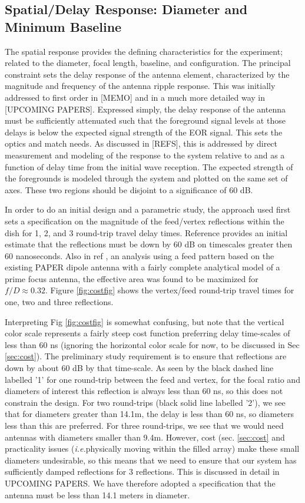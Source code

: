\documentclass{article}
\begin{document}
\subsection{Spatial/Delay Response:  Diameter and Minimum Baseline}
The spatial response provides the defining characteristics for the experiment; related to the diameter, focal length, baseline, and configuration.  The principal constraint sets the delay response of the antenna element, characterized by the magnitude and frequency of the antenna ripple response.  This was initially addressed to first order in [MEMO] and in a much more detailed way in [UPCOMING PAPERS].  Expressed simply, the delay response of the antenna must be sufficiently attenuated such that the foreground signal levels at those delays is below the expected signal strength of the EOR signal.  This sets the optics and match needs.  As discussed in [REFS], this is addressed by direct measurement and modeling of the response to the system relative to and as a function of delay time from the initial wave reception.  The expected strength of the foregrounds is modeled through the system and plotted on the same set of axes.  These two regions should be disjoint to a significance of 60 dB.

In order to do an initial design and a parametric study, the approach used first sets a specification on the magnitude of the feed/vertex reflections within the dish for 1, 2, and 3 round-trip travel delay times.  Reference \cite{heraMemo5} provides an initial estimate that the reflections must be down by 60 dB on timescales greater then 60 nanoseconds.  
Also in ref \cite{heraMemo5}, an analysis using a feed pattern based on the existing PAPER dipole antenna with a fairly complete analytical model of a prime focus antenna, the effective area was found to be maximized for $f/D \approx 0.32$.  Figure \ref{fig:costfig} shows the vertex/feed round-trip travel times for one, two and three reflections.  

Interpreting Fig \ref{fig:costfig} is somewhat confusing, but note that the vertical color scale represents a fairly steep cost function preferring delay time-scales of less than 60 ns (ignoring the horizontal color scale for now, to be discussed in Sec \ref{sec:cost}).  The preliminary study requirement is to ensure that reflections are down by about 60 dB by that time-scale.  As seen by the black dashed line labelled '1' for one round-trip between the feed and vertex, for the focal ratio and diameters of interest  this reflection is always less than 60 ns, so this does not constrain the design.  For two round-trips (black solid line labelled '2'), we see that for diameters greater than 14.1m, the delay is less than 60 ns, so diameters less than this are preferred.  For three round-trips, we see that we would need antennas with diameters smaller than 9.4m.  However, cost (sec. \ref{sec:cost} and practicality issues ({\em i.e.}physically moving within the filled array) make these small diameters undesirable, so this means that we need to ensure that our system has sufficiently damped reflections for 3 reflections.  This is discussed in detail in UPCOMING PAPERS.  We have therefore adopted a specification that the antenna must be less than 14.1 meters in diameter.
\end{document}
